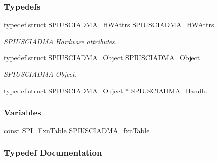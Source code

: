 \subsubsection*{Typedefs}
\begin{DoxyCompactItemize}
\item 
typedef struct \hyperlink{struct_s_p_i_u_s_c_i_a_d_m_a___h_w_attrs}{S\+P\+I\+U\+S\+C\+I\+A\+D\+M\+A\+\_\+\+H\+W\+Attrs} \hyperlink{_s_p_i_u_s_c_i_a_d_m_a_8h_a36eab8cb3bdf2310f5ab1f66a0e12e7a}{S\+P\+I\+U\+S\+C\+I\+A\+D\+M\+A\+\_\+\+H\+W\+Attrs}
\begin{DoxyCompactList}\small\item\em S\+P\+I\+U\+S\+C\+I\+A\+D\+M\+A Hardware attributes. \end{DoxyCompactList}\item 
typedef struct \hyperlink{struct_s_p_i_u_s_c_i_a_d_m_a___object}{S\+P\+I\+U\+S\+C\+I\+A\+D\+M\+A\+\_\+\+Object} \hyperlink{_s_p_i_u_s_c_i_a_d_m_a_8h_add524b2585b8b4aaaede70d3f0356c9d}{S\+P\+I\+U\+S\+C\+I\+A\+D\+M\+A\+\_\+\+Object}
\begin{DoxyCompactList}\small\item\em S\+P\+I\+U\+S\+C\+I\+A\+D\+M\+A Object. \end{DoxyCompactList}\item 
typedef struct \hyperlink{struct_s_p_i_u_s_c_i_a_d_m_a___object}{S\+P\+I\+U\+S\+C\+I\+A\+D\+M\+A\+\_\+\+Object} $\ast$ \hyperlink{_s_p_i_u_s_c_i_a_d_m_a_8h_a4bf7edb9d6368c9d51b97e4733c1dcb3}{S\+P\+I\+U\+S\+C\+I\+A\+D\+M\+A\+\_\+\+Handle}
\end{DoxyCompactItemize}
\subsubsection*{Variables}
\begin{DoxyCompactItemize}
\item 
const \hyperlink{struct_s_p_i___fxn_table}{S\+P\+I\+\_\+\+Fxn\+Table} \hyperlink{_s_p_i_u_s_c_i_a_d_m_a_8h_abb113a7efbb267a0b876ffaf4c68cd89}{S\+P\+I\+U\+S\+C\+I\+A\+D\+M\+A\+\_\+fxn\+Table}
\end{DoxyCompactItemize}


\subsubsection{Typedef Documentation}
